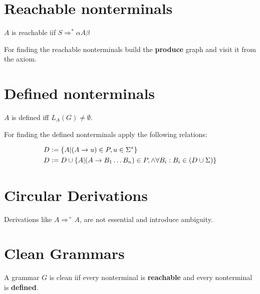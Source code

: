 \section{Reachable nonterminals}

$A$ is reachable iif $S \Rightarrow^* \alpha A \beta$

For finding the reachable nonterminals build the \textbf{produce} graph and visit it from the axiom.

\section{Defined nonterminals}
$A$ is defined iff $L_A(G) \ne \emptyset$.

For finding the defined nonterminals apply the following relations:

\begin{align*}
    D &:= \{ A | (A \rightarrow u) \in P, u \in \Sigma^*\} \\
    D &:= D \cup \{ A | (A \rightarrow B_1\ldots B_n) \in P, \land \forall B_i: B_i \in (D \cup \Sigma) \}
\end{align*}

\section{Circular Derivations}

Derivations like $A \Rightarrow^+ A$, are not essential and introduce ambiguity.

\section{Clean Grammars}
A grammar $G$ is clean iif every nonterminal is \textbf{reachable} and every nonterminal is \textbf{defined}.
